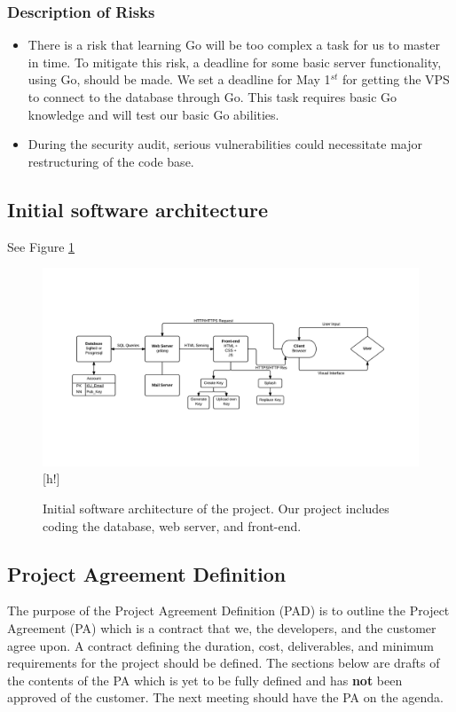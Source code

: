 \documentclass[11pt,a4paper]{article}
\begin{document}
\subsubsection{Description of Risks}
\begin{itemize}
\item There is a risk that learning Go will be too complex a task for us to master in time. To mitigate this risk, a deadline for some basic server functionality, using Go, should be made. We set a deadline for May 1$^{st}$ for getting the VPS to connect to the database through Go. This task requires basic Go knowledge and will test our basic Go abilities.
\item During the security audit, serious vulnerabilities could necessitate major restructuring of the code base.
\end{itemize}
\subsection{Initial software
architecture}
See Figure \ref{fig:ISA}
\begin{figure}
\centering
\includegraphics[width=1.1\textwidth]{pictures/pksu_isa_centered}[h!]
\caption{Initial software architecture of the project. Our project includes coding the database, web server, and front-end.}
\label{fig:ISA}
\end{figure}
\newpage
\subsection{Project Agreement Definition}
The purpose of the Project Agreement Definition (PAD) is to outline the Project Agreement (PA) which is a contract that we, the developers, and the customer agree upon. A contract defining the duration, cost, deliverables, and minimum requirements for the project should be defined. The sections below are drafts of the contents of the PA which is yet to be fully defined and has \textbf{not} been approved of the customer. The next meeting should have the PA on the agenda.
\end{document}
